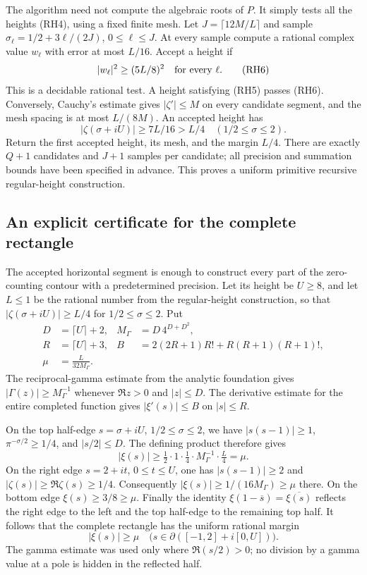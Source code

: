 The algorithm need not compute the algebraic roots of $P$.  It simply tests
all the heights (RH4), using a fixed finite mesh.  Let
$J=\lceil12M/L\rceil$ and sample
$\sigma_\ell=1/2+3\ell/(2J)$, $0\le\ell\le J$.
At every sample compute a rational complex value $w_\ell$ with error at most
$L/16$.  Accept a height if
\[
 |w_\ell|^2\ge(5L/8)^2\quad\hbox{for every }\ell.        \tag{RH6}
\]
This is a decidable rational test.  A height satisfying (RH5) passes (RH6).
Conversely, Cauchy's estimate gives $|\zeta'|\le M$ on every candidate
segment, and the mesh spacing is at most $L/(8M)$.  An accepted height has
\[
 |\zeta(\sigma+iU)|\ge7L/16>L/4
 \quad(1/2\le\sigma\le2).                               \tag{RH7}
\]
Return the first accepted height, its mesh, and the margin $L/4$.
There are exactly $Q+1$ candidates and $J+1$ samples per candidate; all
precision and summation bounds have been specified in advance.
This proves a uniform primitive recursive regular-height construction.

\subsection{An explicit certificate for the complete rectangle}
\label{sec:complete-contour}

The accepted horizontal segment is enough to construct every part of the
zero-counting contour with a predetermined precision.  Let its height be
$U\ge8$, and let $L\le1$ be the rational number from the regular-height
construction, so that
$|\zeta(\sigma+iU)|\ge L/4$ for $1/2\le\sigma\le2$.
Put
\[
 \begin{aligned}
 D&=\lceil U\rceil+2,
 & M_\Gamma&=D\,4^{D+D^2},\\
 R&=\lceil U\rceil+3,
 & B&=2(2R+1)R!+R(R+1)(R+1)!,\\
 \mu&=\frac{L}{32M_\Gamma}.
 \end{aligned}                                             \tag{FC1}
\]
The reciprocal-gamma estimate from the analytic foundation gives
$|\Gamma(z)|\ge M_\Gamma^{-1}$ whenever
$\Re z>0$ and $|z|\le D$.
The derivative estimate for the entire completed function gives
$|\xi'(s)|\le B$ on $|s|\le R$.

On the top half-edge $s=\sigma+iU$, $1/2\le\sigma\le2$, we have
$|s(s-1)|\ge1$, $\pi^{-\sigma/2}\ge1/4$, and $|s/2|\le D$.
The defining product therefore gives
\[
 |\xi(s)|\ge \tfrac12\cdot1\cdot\tfrac14
                 \cdot M_\Gamma^{-1}\cdot\tfrac L4=\mu.
\]
On the right edge $s=2+it$, $0\le t\le U$, one has
$|s(s-1)|\ge2$ and $|\zeta(s)|\ge\Re\zeta(s)\ge1/4$.
Consequently $|\xi(s)|\ge1/(16M_\Gamma)\ge\mu$ there.
On the bottom edge $\xi(s)\ge3/8\ge\mu$.
Finally the identity
$\xi(1-\overline s)=\overline{\xi(s)}$
reflects the right edge to the left and the top half-edge to the remaining
top half.  It follows that the complete rectangle has the uniform rational
margin
\[
 |\xi(s)|\ge\mu
 \quad\bigl(s\in\partial([-1,2]+i[0,U])\bigr).          \tag{FC2}
\]
The gamma estimate was used only where $\Re(s/2)>0$; no division by a gamma
value at a pole is hidden in the reflected half.

